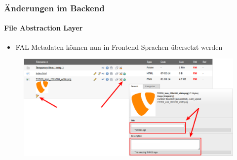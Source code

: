 
\begin{frame}[fragile]
	\frametitle{Änderungen im Backend}
	\framesubtitle{File Abstraction Layer}

	\begin{itemize}
		\item FAL Metadaten können nun in Frontend-Sprachen übersetzt werden
	\end{itemize}

	\begin{figure}
		\includegraphics[width=0.95\linewidth]{Images/BackendChanges/FalTranslateMetaData.png}
	\end{figure}

\end{frame}


